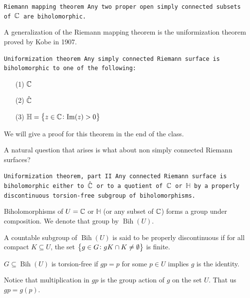 \documentclass[11pt,a4paper]{article}
\DeclareMathOperator{\Bih}{Bih}
\renewcommand{\H}{\mathbb H}
\begin{document}
\begin{theorem}\tt{Riemann mapping theorem}
    Any two proper open simply connected subsets of $\mathbb{C}$ are biholomorphic.
\end{theorem}

A generalization of the Riemann mapping theorem is the uniformization theorem
proved by Kobe in 1907.

\begin{theorem}\tt{Uniformization theorem}
    Any simply connected Riemann surface is biholomorphic to one of the
    following:
    \begin{enumerate}
        \item[(1)] $\mathbb{C}$
        \item[(2)] $\hat{\mathbb{C}}$
        \item[(3)] $\H = \set{z \in \C \colon \mathrm{Im}(z) > 0}$
    \end{enumerate}
\end{theorem}

We will give a proof for this theorem in the end of the class.

A natural question that arises is what about non simply connected Riemann
surfaces?

\begin{theorem}\tt{Uniformization theorem, part II}
    Any connected Riemann surface is biholomorphic either to $\hat{\mathbb{C}}$
    or to a quotient of $\mathbb{C}$ or $\H$ by a properly discontinuous
    torsion-free subgroup of biholomorphisms.
\end{theorem}

\begin{remark}
    Biholomorphisms of $U = \mathbb{C}$ or $\H$ (or any subset of $\mathbb{C}$)
    forms a group under composition.
    We denote that group by $\Bih(U)$.
\end{remark}

\begin{definition}
    A countable subgroup of $\Bih(U)$ is said to be properly discontinuous
    if for all compact $K \subseteq U$, the set 
    $\set{g \in G \colon gK \cap K \neq \emptyset}$ is finite.
\end{definition}

\begin{definition}
    $G \subseteq \Bih(U)$ is torsion-free if $gp = p$ for some $p \in U$
    implies $g$ is the identity.
\end{definition}

\begin{remark}
  Notice that multiplication in $gp$ is the group action of $g$ on the 
  set $U$. That us $gp = g(p)$.
\end{remark}
\end{document}
